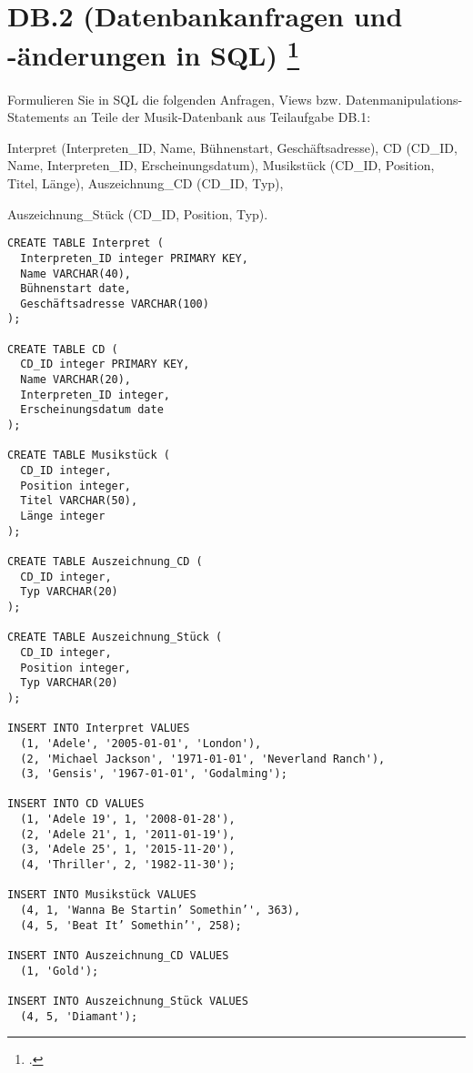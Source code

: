\documentclass{lehramt-informatik-aufgabe}
\begin{document}
\section{DB.2 (Datenbankanfragen und -änderungen in SQL)
\footcite{examen:66116:2015:03}}

Formulieren Sie in SQL die folgenden Anfragen, Views bzw.
Datenmanipulations-Statements an Teile der Musik-Datenbank aus
Teilaufgabe DB.1:

Interpret (Interpreten\_ID, Name, Bühnenstart, Geschäftsadresse),
CD (CD\_ID, Name, Interpreten\_ID, Erscheinungsdatum),
Musikstück (CD\_ID, Position, Titel, Länge),
Auszeichnung\_CD (CD\_ID, Typ),

Auszeichnung\_Stück (CD\_ID, Position, Typ).

\begin{verbatim}
CREATE TABLE Interpret (
  Interpreten_ID integer PRIMARY KEY,
  Name VARCHAR(40),
  Bühnenstart date,
  Geschäftsadresse VARCHAR(100)
);

CREATE TABLE CD (
  CD_ID integer PRIMARY KEY,
  Name VARCHAR(20),
  Interpreten_ID integer,
  Erscheinungsdatum date
);

CREATE TABLE Musikstück (
  CD_ID integer,
  Position integer,
  Titel VARCHAR(50),
  Länge integer
);

CREATE TABLE Auszeichnung_CD (
  CD_ID integer,
  Typ VARCHAR(20)
);

CREATE TABLE Auszeichnung_Stück (
  CD_ID integer,
  Position integer,
  Typ VARCHAR(20)
);

INSERT INTO Interpret VALUES
  (1, 'Adele', '2005-01-01', 'London'),
  (2, 'Michael Jackson', '1971-01-01', 'Neverland Ranch'),
  (3, 'Gensis', '1967-01-01', 'Godalming');

INSERT INTO CD VALUES
  (1, 'Adele 19', 1, '2008-01-28'),
  (2, 'Adele 21', 1, '2011-01-19'),
  (3, 'Adele 25', 1, '2015-11-20'),
  (4, 'Thriller', 2, '1982-11-30');

INSERT INTO Musikstück VALUES
  (4, 1, 'Wanna Be Startin’ Somethin’', 363),
  (4, 5, 'Beat It’ Somethin’', 258);

INSERT INTO Auszeichnung_CD VALUES
  (1, 'Gold');

INSERT INTO Auszeichnung_Stück VALUES
  (4, 5, 'Diamant');
\end{verbatim}
\end{document}
